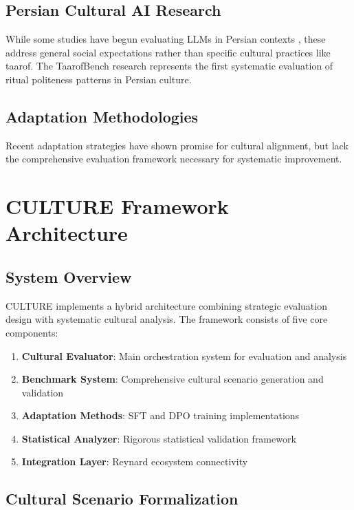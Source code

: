 \documentclass[11pt,twocolumn]{article}
\begin{document}
\subsection{Persian Cultural AI Research}

While some studies have begun evaluating LLMs in Persian contexts \cite{saffari2024,moosavi2025,pourbahman2025}, these address general social expectations rather than specific cultural practices like taarof. The TaarofBench research represents the first systematic evaluation of ritual politeness patterns in Persian culture.

\subsection{Adaptation Methodologies}

Recent adaptation strategies \cite{dwivedi2023,alkhamissi2024,masoud2025,liu2025} have shown promise for cultural alignment, but lack the comprehensive evaluation framework necessary for systematic improvement.

\section{CULTURE Framework Architecture}

\subsection{System Overview}

CULTURE implements a hybrid architecture combining strategic evaluation design with systematic cultural analysis. The framework consists of five core components:

\begin{enumerate}
    \item \textbf{Cultural Evaluator}: Main orchestration system for evaluation and analysis
    \item \textbf{Benchmark System}: Comprehensive cultural scenario generation and validation
    \item \textbf{Adaptation Methods}: SFT and DPO training implementations
    \item \textbf{Statistical Analyzer}: Rigorous statistical validation framework
    \item \textbf{Integration Layer}: Reynard ecosystem connectivity
\end{enumerate}

\subsection{Cultural Scenario Formalization}
\end{document}
